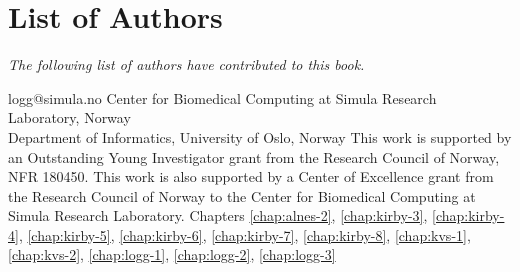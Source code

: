 \chapter*{List of Authors}

\emph{The following list of authors have contributed to this book.}

\vspace{1cm}
















             {logg@simula.no}
             {Center for Biomedical Computing at Simula Research Laboratory, Norway \\
              Department of Informatics, University of Oslo, Norway}
             {This work is supported by an Outstanding Young
              Investigator grant from the Research Council of Norway,
              NFR 180450. This work is also supported by a Center of
              Excellence grant from the Research Council of Norway to
              the Center for Biomedical Computing at Simula Research
              Laboratory.}
             {Chapters
              \ref{chap:alnes-2}, \ref{chap:kirby-3}, \ref{chap:kirby-4},
              \ref{chap:kirby-5}, \ref{chap:kirby-6}, \ref{chap:kirby-7},
              \ref{chap:kirby-8}, \ref{chap:kvs-1}, \ref{chap:kvs-2},
              \ref{chap:logg-1}, \ref{chap:logg-2}, \ref{chap:logg-3}}

